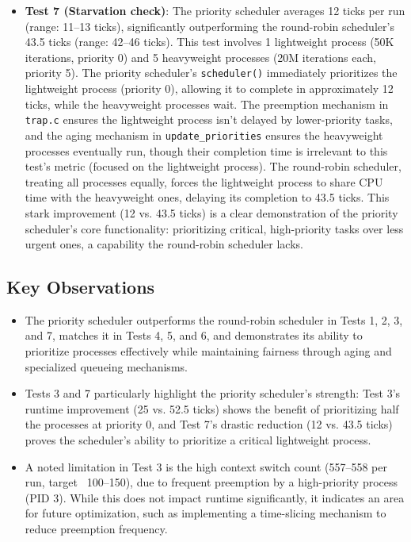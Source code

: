 \documentclass{article}
\begin{document}
\begin{itemize}
    \item \textbf{Test 7 (Starvation check)}: The priority scheduler averages 12 ticks per run (range: 11–13 ticks), significantly outperforming the round-robin scheduler’s 43.5 ticks (range: 42–46 ticks). This test involves 1 lightweight process (50K iterations, priority 0) and 5 heavyweight processes (20M iterations each, priority 5). The priority scheduler’s \texttt{scheduler()} immediately prioritizes the lightweight process (priority 0), allowing it to complete in approximately 12 ticks, while the heavyweight processes wait. The preemption mechanism in \texttt{trap.c} ensures the lightweight process isn’t delayed by lower-priority tasks, and the aging mechanism in \texttt{update\_priorities} ensures the heavyweight processes eventually run, though their completion time is irrelevant to this test’s metric (focused on the lightweight process). The round-robin scheduler, treating all processes equally, forces the lightweight process to share CPU time with the heavyweight ones, delaying its completion to 43.5 ticks. This stark improvement (12 vs. 43.5 ticks) is a clear demonstration of the priority scheduler’s core functionality: prioritizing critical, high-priority tasks over less urgent ones, a capability the round-robin scheduler lacks.
\end{itemize}

\subsection{Key Observations}
\begin{itemize}
    \item The priority scheduler outperforms the round-robin scheduler in Tests 1, 2, 3, and 7, matches it in Tests 4, 5, and 6, and demonstrates its ability to prioritize processes effectively while maintaining fairness through aging and specialized queueing mechanisms.
    \item Tests 3 and 7 particularly highlight the priority scheduler’s strength: Test 3’s runtime improvement (25 vs. 52.5 ticks) shows the benefit of prioritizing half the processes at priority 0, and Test 7’s drastic reduction (12 vs. 43.5 ticks) proves the scheduler’s ability to prioritize a critical lightweight process.
    \item A noted limitation in Test 3 is the high context switch count (557–558 per run, target ~100–150), due to frequent preemption by a high-priority process (PID 3). While this does not impact runtime significantly, it indicates an area for future optimization, such as implementing a time-slicing mechanism to reduce preemption frequency.
\end{itemize}
\end{document}
